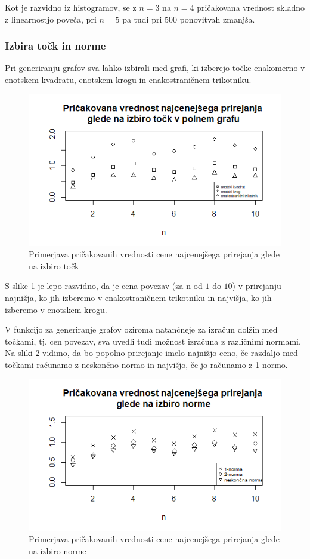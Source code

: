 \documentclass[a4paper, 11pt]{article}
\begin{document}
Kot je razvidno iz histogramov, se z $n=3$ na $n=4$ pričakovana vrednost skladno z linearnostjo poveča, pri $n=5$ pa tudi pri $500$ ponovitvah zmanjša.

\subsubsection*{Izbira točk in norme}
Pri generiranju grafov sva lahko izbirali med grafi, ki izberejo točke enakomerno v enotskem kvadratu, enotskem krogu in enakostraničnem trikotniku.
\begin{figure}[!htb]
    \includegraphics[scale=0.5]{izbira_tock_polni}
    \centering
    \caption{Primerjava pričakovanih vrednosti cene najcenejšega prirejanja glede na izbiro točk}
    \label{fig:tocke}
\end{figure}

S slike \ref{fig:tocke} je lepo razvidno, da je cena povezav (za n od $1$ do $10$) v prirejanju najnižja, ko jih izberemo v enakostraničnem trikotniku in najvišja, ko jih izberemo v enotskem krogu.

V funkcijo za generiranje grafov oziroma natančneje za izračun dolžin med točkami, tj. cen povezav, sva uvedli tudi možnost izračuna z različnimi normami.
Na sliki \ref{fig:norme} vidimo, da bo popolno prirejanje imelo najnižjo ceno, če razdaljo med točkami računamo z neskončno normo in najvišjo, če jo računamo z 1-normo.

\begin{figure}[!htb]
    \includegraphics[scale=0.6]{izbira_norme}
    \centering
    \caption{Primerjava pričakovanih vrednosti cene najcenejšega prirejanja glede na izbiro norme}
    \label{fig:norme}
\end{figure}
\end{document}
